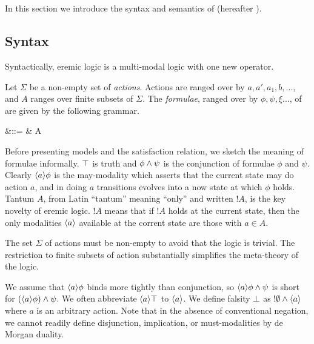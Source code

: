 \section{\ELFULL}\label{coreEL}

In this section we introduce the syntax and semantics of \ELFULL{}
(hereafter \ELABR{}).  

\subsection{Syntax}
\label{elsyntax}
\NI Syntactically, eremic logic is a multi-modal logic with one new
operator.

\begin{definition} Let $\Sigma$ be a non-empty set of \emph{actions}.
Actions are ranged over by $a, a', a_1, b, ...$, and $A$ ranges over
finite subsets of $\Sigma$. The \emph{formulae}, ranged over by $\phi,
\psi, \xi ...$, of \ELABR{} are given by the
following grammar.

\begin{GRAMMAR}
  \phi 
     &\quad ::= \quad & 
  \TRUE 
     \VERTICAL 
  \phi \AND \psi
     \VERTICAL 
     \VERTICAL 
  \fBang A 
\end{GRAMMAR}
\end{definition}

\NI Before presenting models and the satisfaction relation, we sketch
the meaning of formulae informally. $\top$ is truth and $\phi \land
\psi$ is the conjunction of formulae $\phi$ and $\psi$. Clearly
$\langle a \rangle \phi$ is the may-modality which asserts that the current
state may do action $a$, and in doing $a$ transitions evolves into a
now state at which $\phi$ holds. Tantum $A$, from Latin ``tantum''
meaning ``only'' and written $!A$, is the key novelty of eremic logic.
$!A$ means that if $!A$ holds at the current state, then the only
modalities $\langle a \rangle$ available at the corrent state are those with
$a \in A$.

The set $\Sigma$ of actions must be non-empty to avoid that the logic
is trivial. The restriction to finite subsets of action substantially
simplifies the meta-theory of the logic.

We assume that $\langle a \rangle \phi$ binds more tightly than conjunction, so
$\langle a \rangle \phi \land \psi$ is short for $(\langle a \rangle \phi) \land \psi$.
We often abbreviate $\langle a \rangle \top$ to $\langle a \rangle$. We define falsity
$\bot$ as $!\emptyset \land \langle a \rangle$ where $a$ is an arbitrary
action. Note that in the absence of conventional negation, we cannot
readily define disjunction, implication, or must-modalities by de
Morgan duality. 

